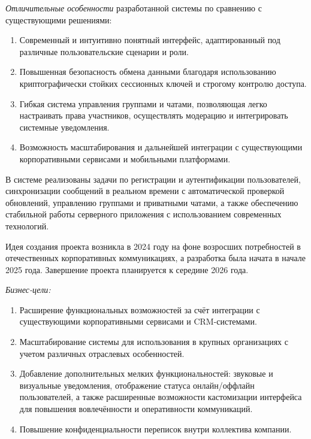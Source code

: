 \textit{Отличительные особенности} разработанной системы по сравнению с существующими решениями:
\begin{enumerate}
	\item Современный и интуитивно понятный интерфейс, адаптированный под различные пользовательские сценарии и роли.
	\item Повышенная безопасность обмена данными благодаря использованию криптографически стойких сессионных ключей и строгому контролю доступа.
	\item Гибкая система управления группами и чатами, позволяющая легко настраивать права участников, осуществлять модерацию и интегрировать системные уведомления.
	\item Возможность масштабирования и дальнейшей интеграции с существующими корпоративными сервисами и мобильными платформами.
\end{enumerate}

В системе реализованы задачи по регистрации и аутентификации пользователей, синхронизации сообщений в реальном времени с автоматической проверкой обновлений, управлению группами и приватными чатами, а также обеспечению стабильной работы серверного приложения с использованием современных технологий.

Идея создания проекта возникла в 2024 году на фоне возросших потребностей в отечественных корпоративных коммуникациях, а разработка была начата в начале 2025 года. Завершение проекта планируется к середине 2026 года.

\textit{Бизнес-цели:}
\begin{enumerate}
	\item Расширение функциональных возможностей за счёт интеграции с существующими корпоративными сервисами и CRM-системами.
	\item Масштабирование системы для использования в крупных организациях с учетом различных отраслевых особенностей.
	\item Добавление дополнительных мелких функциональностей: звуковые и визуальные уведомления, отображение статуса онлайн/оффлайн пользователей, а также расширенные возможности кастомизации интерфейса для повышения вовлечённости и оперативности коммуникаций.
	\item Повышение конфиденциальности переписок внутри коллектива компании.
\end{enumerate}